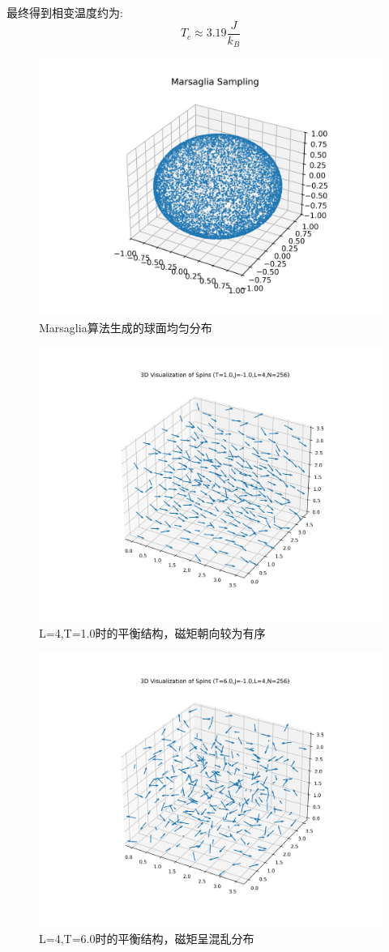 \documentclass[11pt]{article}
\begin{document}
最终得到相变温度约为:
\[T_c\approx 3.19 \frac{J}{k_B}\]

\begin{figure}[htpb]
    \centering
    \includegraphics[width=0.6\linewidth]{photo/Marsaglia.png}
    \caption{Marsaglia算法生成的球面均匀分布}
    \label{fig:mar}
  \end{figure}

  \begin{figure}[htpb]
    \centering
    \includegraphics[width=0.6\linewidth]{photo/T=1.0.png}
    \caption{L=4,T=1.0时的平衡结构，磁矩朝向较为有序}
    \label{fig:t1}
  \end{figure}
  \begin{figure}[htpb]
    \centering
    \includegraphics[width=0.6\linewidth]{photo/T=6.0.png}
    \caption{L=4,T=6.0时的平衡结构，磁矩呈混乱分布}
    \label{fig:t6}
  \end{figure}
\end{document}
